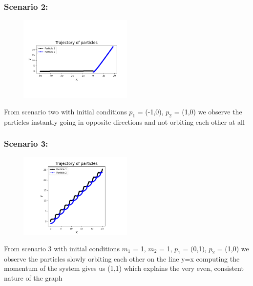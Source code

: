 \documentclass{article}
\begin{document}
            \subsubsection*{Scenario 2:}
            \begin{figure}[h]  %
                \centering
                \includegraphics[width=0.5\textwidth]{Scenario_2.png}  %
                \label{fig:Scenario 2}
            \end{figure}
            From scenario two with initial conditions $p_1$ = (-1,0), $p_2$ = (1,0) we observe the particles instantly going in opposite directions
            and not orbiting each other at all
            \newpage

            \subsubsection*{Scenario 3:}
                \begin{figure}[h]  %
                    \centering
                    \includegraphics[width=0.5\textwidth]{Scenario_3.png}  %
                    \label{fig:Scenario 3}
                \end{figure}
                From scenario 3 with initial conditions $m_1$ = 1, $m_2$ = 1, $p_1$ = (0,1), $p_2$ = (1,0) we observe the particles slowly orbiting each other on the line y=x
                computing the momentum of the system gives us (1,1) which explains the very even, consistent nature of the graph
\end{document}

